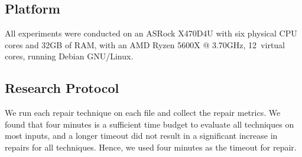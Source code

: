 \documentclass[acmsmall,screen,review,anonymous]{acmart}
\begin{document}
\begin{comment}
\subsection{Metrics and Measures} We employ the following metrics and measures to evaluate repair quality: 

\begin{itemize}

\item[(a.)] \textit{Number of Repaired Inputs:} We count the number of files repaired before
a four minute timeout for each repair method.
 
\item[(b.)]  \textit{File Size Difference:} To determine the amount of data recovered by each approach, 
we evaluate the difference in \emph{file size} of
the \emph{recovered inputs} and the original
\emph{valid input}. %

\item[(c.)]  \textit{Edit Distance:} This is measured as the number of characters that
differs between the \emph{corrupt input} and the \emph{repaired input}.

\item[(d.)]  \textit{Runtime} is the time taken for input repair for each method.

\item[(e.)]  \textit{Number of Program Runs:} To evaluate efficiency, we track the number of times the parser is executed by each approach. 

\end{itemize}
\end{comment}






\subsection{Platform}
All experiments were conducted
on an ASRock X470D4U with six physical CPU cores and 32GB of RAM, with an AMD Ryzen 5600X @ 3.70GHz, 12~virtual cores, running Debian GNU/Linux.


\subsection{Research Protocol}
We run each repair technique on each file and collect the repair metrics.
We found that four minutes is a sufficient time budget to evaluate all
techniques on most inputs, and a longer timeout did not result in a
significant increase in repairs for all techniques. Hence, we used four
minutes as the timeout for repair.
\end{document}
